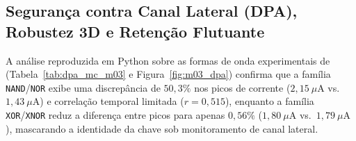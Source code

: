 \subsection{Seguran\c{c}a contra Canal Lateral (DPA), Robustez 3D e Reten\c{c}\~{a}o Flutuante}\label{sec:res_dpa_mc}

A an\'{a}lise reproduzida em Python sobre as formas de onda experimentais de~\cite{wu2020reconfigurable} (Tabela~\ref{tab:dpa_mc_m03} e Figura~\ref{fig:m03_dpa}) confirma que a fam\'{i}lia \texttt{NAND}/\texttt{NOR} exibe uma discrep\^{a}ncia de $50{,}3\%$ nos picos de corrente ($2{,}15\ \mu\text{A}$ vs.\ $1{,}43\ \mu\text{A}$) e correla\c{c}\~{a}o temporal limitada ($r = 0{,}515$), enquanto a fam\'{i}lia \texttt{XOR}/\texttt{XNOR} reduz a diferen\c{c}a entre picos para apenas $0{,}56\%$ ($1{,}80\ \mu\text{A}$ vs.\ $1{,}79\ \mu\text{A}$), mascarando a identidade da chave sob monitoramento de canal lateral.

